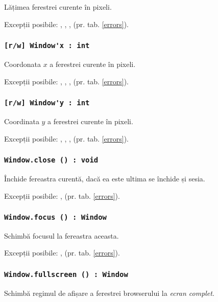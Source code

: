Lățimea ferestrei curente în pixeli.

Excepții posibile: , , ,  (pr. tab. \ref{errors}).

\subsubsection{\lstinline|[r/w] Window'x : int|}

Coordonata $x$ a ferestrei curente în pixeli.

Excepții posibile: , , ,  (pr. tab. \ref{errors}).

\subsubsection{\lstinline|[r/w] Window'y : int|}

Coordinata $y$ a ferestrei curente în pixeli.

Excepții posibile: , , ,  (pr. tab. \ref{errors}).

\subsubsection{\lstinline|Window.close () : void|}

Închide fereastra curentă, dacă ea este ultima se închide și sesia.

Excepții posibile: ,  (pr. tab. \ref{errors}).

\subsubsection{\lstinline|Window.focus () : Window|}

Schimbă focusul la fereastra aceasta.

Excepții posibile: ,  (pr. tab. \ref{errors}).

\subsubsection{\lstinline|Window.fullscreen () : Window|}

Schimbă regimul de afișare a ferestrei browserului la \textit{ecran complet}.

